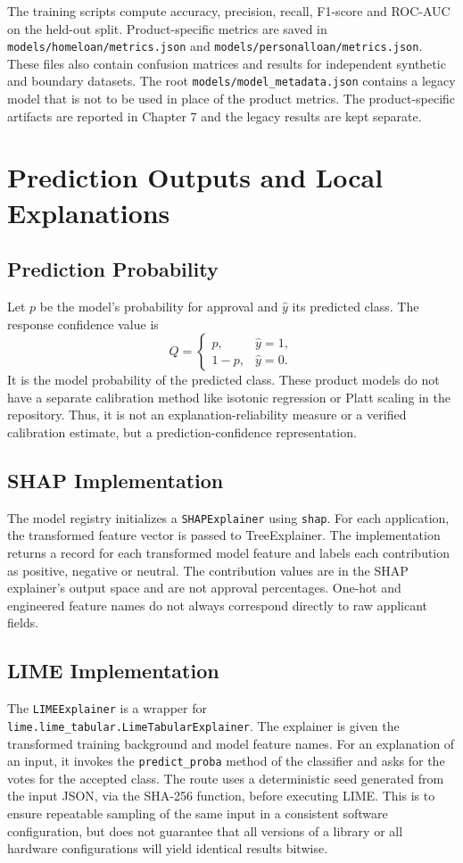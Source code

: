 The training scripts compute accuracy, precision, recall, F1-score and ROC-AUC on the held-out split. Product-specific metrics are saved in \texttt{models/homeloan/metrics.json} and \texttt{models/personalloan/metrics.json}. These files also contain confusion matrices and results for independent synthetic and boundary datasets. The root \texttt{models/model\_metadata.json} contains a legacy model that is not to be used in place of the product metrics. The product-specific artifacts are reported in Chapter 7 and the legacy results are kept separate.

\section{Prediction Outputs and Local Explanations}
\subsection{Prediction Probability}
Let $p$ be the model's probability for approval and $\hat y$ its predicted class. The response confidence value is
\begin{equation}
  Q=\begin{cases}p,&\hat y=1,\\1-p,&\hat y=0.\end{cases}
\end{equation}
It is the model probability of the predicted class. These product models do not have a separate calibration method like isotonic regression or Platt scaling in the repository. Thus, it is not an explanation-reliability measure or a verified calibration estimate, but a prediction-confidence representation.

\subsection{SHAP Implementation}
The model registry initializes a \texttt{SHAPExplainer} using \texttt{shap}. For each application, the transformed feature vector is passed to TreeExplainer. The implementation returns a record for each transformed model feature and labels each contribution as positive, negative or neutral. The contribution values are in the SHAP explainer's output space and are not approval percentages. One-hot and engineered feature names do not always correspond directly to raw applicant fields.

\subsection{LIME Implementation}
The \texttt{LIMEExplainer} is a wrapper for \texttt{lime.lime\_tabular.LimeTabularExplainer}. The explainer is given the transformed training background and model feature names. For an explanation of an input, it invokes the \texttt{predict\_proba} method of the classifier and asks for the votes for the accepted class. The route uses a deterministic seed generated from the input JSON, via the SHA-256 function, before executing LIME. This is to ensure repeatable sampling of the same input in a consistent software configuration, but does not guarantee that all versions of a library or all hardware configurations will yield identical results bitwise.

